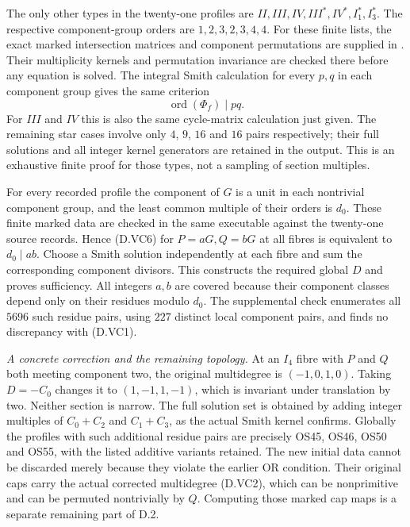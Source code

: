 The only other types in the twenty-one profiles are
$II,III,IV,III^*,IV^*,I_1^*,I_3^*$.
The respective component-group orders are $1,2,3,2,3,4,4$.
For these finite lists, the exact marked intersection
matrices and component permutations are supplied in
.
Their multiplicity kernels and permutation invariance are
checked there before any equation is solved. The integral
Smith calculation for every $p,q$ in each component group
gives the same criterion
\[
              \operatorname{ord}(\Phi_f)\mid pq.           \tag{D.VC6}
\]
For $III$ and $IV$ this is also the same cycle-matrix
calculation just given. The remaining star cases involve
only $4$, $9$, $16$ and $16$ pairs respectively; their
full solutions and all integer kernel generators are
retained in the output. This is an exhaustive finite
proof for those types, not a sampling of section multiples.

For every recorded profile the component of $G$ is a unit
in each nontrivial component group, and the least common
multiple of their orders is $d_0$. These finite marked
data are checked in the same executable against the
twenty-one source records. Hence (D.VC6) for $P=aG,Q=bG$
at all fibres is equivalent to $d_0\mid ab$.
Choose a Smith solution independently at each fibre and
sum the corresponding component divisors. This constructs
the required global $D$ and proves sufficiency.
All integers $a,b$ are covered because their component
classes depend only on their residues modulo $d_0$.
The supplemental check enumerates all $5696$ such residue
pairs, using $227$ distinct local component pairs, and
finds no discrepancy with (D.VC1).

\emph{A concrete correction and the remaining topology.}
At an $I_4$ fibre with $P$ and $Q$ both meeting component
two, the original multidegree is $(-1,0,1,0)$.
Taking $D=-C_0$ changes it to $(1,-1,1,-1)$, which is
invariant under translation by two. Neither section is
narrow. The full solution set is obtained by adding
integer multiples of $C_0+C_2$ and $C_1+C_3$, as the
actual Smith kernel confirms.
Globally the profiles with such additional residue pairs
are precisely OS45, OS46, OS50 and OS55, with the listed
additive variants retained. The new initial data cannot
be discarded merely because they violate the earlier OR
condition. Their original caps carry the actual corrected
multidegree (D.VC2), which can be nonprimitive and can
be permuted nontrivially by $Q$. Computing those marked
cap maps is a separate remaining part of D.2.
